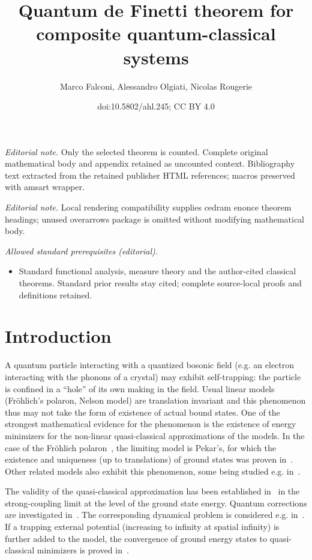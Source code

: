 \documentclass[10pt]{amsart}
\title{Quantum de Finetti theorem for composite quantum-classical systems}
\author{Marco Falconi, Alessandro Olgiati, Nicolas Rougerie}
\date{doi:10.5802/ahl.245; CC BY 4.0}
\theoremstyle{definition}\newtheorem{defi}[theo]{Definition}\newtheorem{rema}[theo]{Remark}\newtheorem{exam}[theo]{Example}\newtheorem{exem}[theo]{Example}\newtheorem{nota}[theo]{Notation}
\newcommand{\1}{\mathds{1}}
\begin{document}
\maketitle
\noindent\textit{Editorial note.} Only the selected theorem is counted. Complete original mathematical body and appendix retained as uncounted context. Bibliography text extracted from the retained publisher HTML references; macros preserved with amsart wrapper.\par\medskip
\noindent\textit{Editorial note.} Local rendering compatibility supplies cedram enonce theorem headings; unused overarrows package is omitted without modifying mathematical body.\par\medskip
\noindent\textit{Allowed standard prerequisites (editorial).}\begin{itemize}
\item Standard functional analysis, measure theory and the author-cited classical theorems. Standard prior results stay cited; complete source-local proofs and definitions retained.
\end{itemize}\medskip


\section{Introduction}

A quantum particle interacting with a quantized bosonic field (e.g. an electron interacting with the phonons of a crystal) may exhibit self-trapping: the particle is confined in a ``hole'' of its own making in the field. Usual linear models (Fr\"ohlich's polaron, Nelson model) are translation invariant and this phenomenon thus may not take the form of existence of actual bound states. One of the strongest mathematical evidence for the phenomenon is the existence of energy minimizers for the non-linear quasi-classical approximations of the models. In the case of the Fr\"ohlich polaron~\cite{Moller-06,Seiringer-19}, the limiting model is Pekar's, for which the existence and uniqueness (up to translations) of ground states was proven in~\cite{Lieb-77,Lions-80}. Other related models also exhibit this phenomenon, some being studied e.g. in~\cite{BreFauPay-22a,BreFauPay-22b,FroJonLen-07b,FroJonLen-07,LewRou-13,LewRou-13b,Ricaud-14}.

The validity of the quasi-classical approximation has been established in~\cite{DonVar-83,LieTho-97,MiySpo-07} in the strong-coupling limit at the level of the ground state energy. Quantum corrections are investigated in~\cite{BroSei-22,FraSei-19,FelSei-21}. The corresponding dynamical problem is considered e.g. in~\cite{CorFalOli-19,FalLeoMitPet-21,
FraGan-17,GriSchSch-17,Griesemer-17,
LeoMitSei-20,
LeoRadSchSei-19}. If a trapping external potential (increasing to infinity at spatial infinity) is further added to the model, the convergence of ground energy states to quasi-classical minimizers is proved in~\cite{CorFalOli-20}.
\end{document}
